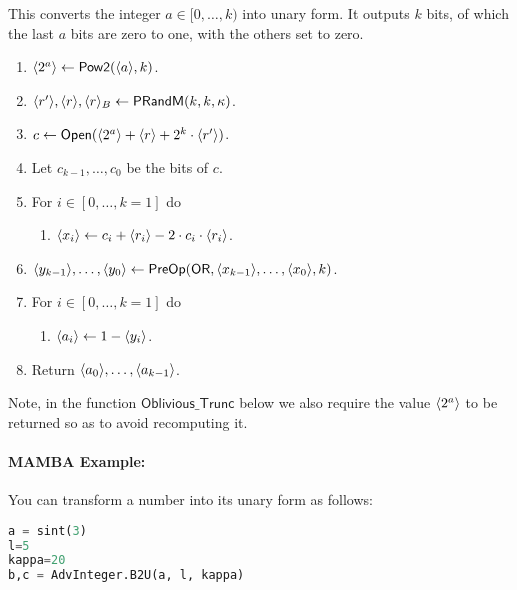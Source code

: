   This converts the integer $a \in [0,\ldots,k)$ into unary form.
  It outputs $k$ bits, of which the last $a$ bits are zero to one,
  with the others set to zero.
  \begin{enumerate}
    \item $\langle 2^a \rangle \leftarrow \mathsf{Pow2}(\langle a \rangle,k)$.
    \item $\langle r' \rangle, \langle r \rangle, \langle r \rangle_B \leftarrow \mathsf{PRandM}(k,k,\kappa)$.
    \item $c \leftarrow {\mathsf{Open}}(\langle 2^a \rangle+\langle r \rangle+2^k \cdot \langle r' \rangle)$.
    \item Let $c_{k-1},\ldots,c_0$ be the bits of $c$.
    \item For $i \in [0,\ldots,k=1]$ do
          \begin{enumerate}
            \item $\langle x_i \rangle \leftarrow c_i+\langle r_i \rangle-2 \cdot c_i \cdot \langle r_i \rangle$.
          \end{enumerate}
    \item $\langle y_{k-1} \rangle,\ldots,\langle y_0 \rangle \leftarrow \mathsf{PreOp}(\mathsf{OR},\langle x_{k-1} \rangle,\ldots,\langle x_0 \rangle,k)$.
    \item For $i \in [0,\ldots,k=1]$ do
          \begin{enumerate}
            \item $\langle a_i \rangle \leftarrow 1-\langle y_i \rangle$.
          \end{enumerate}
    \item Return $\langle a_0 \rangle,\ldots,\langle a_{k-1} \rangle$.
  \end{enumerate}
  Note, in the function $\mathsf{Oblivious\_Trunc}$ below we also require the
  value $\langle 2^a \rangle$ to be returned so as to avoid recomputing it.

  \paragraph{MAMBA Example:} You can transform a number into its unary form as follows:
  \begin{lstlisting}[language={python}]
a = sint(3)
l=5
kappa=20
b,c = AdvInteger.B2U(a, l, kappa)
\end{lstlisting}


